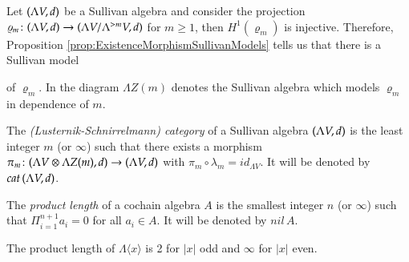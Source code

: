 \par

Let $(\Lambda V,d)$ be a Sullivan algebra and consider the projection 
$\varrho_m \colon (\Lambda V,d) \to (\Lambda V / \Lambda^{> m} V , d)$ for $m \geq 1$, then $H^1(\varrho_m)$ is injective.
Therefore, Proposition \ref{prop:ExistenceMorphismSullivanModels} tells us that there is a Sullivan model

\centerline{
}

of $\varrho_m$. In the diagram $\Lambda Z(m)$ denotes the Sullivan algebra which models $\varrho_m$ in dependence of $m$.

\begin{Definition}
\label{def:LSCategory}
 The \emph{(Lusternik-Schnirrelmann) category} of a Sullivan algebra $(\Lambda V,d)$ is the 
 least integer $m$ (or $\infty$) such that there exists a morphism 
 $\pi_m \colon (\Lambda V \otimes \Lambda Z(m) , d) \to (\Lambda V,d)$ with $\pi_m \circ \lambda_m = id_{\Lambda V}$.
 It will be denoted by $cat \, (\Lambda V,d)$.
\end{Definition}

\begin{Definition}
 The \emph{product length} of a cochain algebra $A$ is the smallest integer $n$ (or $\infty$) such that 
 $\Pi_{i = 1}^{n+1} a_i = 0$  for all $a_i \in A$. It will be denoted by $nil \,A$.
\end{Definition}

\begin{Example}
 The product length of $\Lambda \langle x \rangle$ is 2 for $|x|$ odd and $\infty$ for $|x|$ even.
\end{Example}

